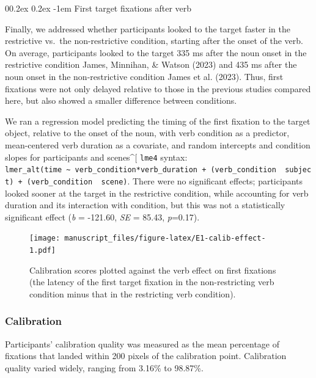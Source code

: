 \documentclass[
  man,floatsintext]{apa6}
\makeatletter
\let\oldparagraph\paragraph
\renewcommand{\paragraph}[1]{\oldparagraph{#1}\mbox{}}
\renewcommand{\paragraph}{\@startsection{paragraph}{4}{\parindent}%
  {0\baselineskip \@plus 0.2ex \@minus 0.2ex}%
  {-1em}%
  {\normalfont\normalsize\bfseries\itshape\typesectitle}}
\makeatother
\begin{document}
\paragraph{First target fixations after verb}\label{first-target-fixations-after-verb}

Finally, we addressed whether participants looked to the target faster in the restrictive vs.~the non-restrictive condition, starting after the onset of the verb. On average, participants looked to the target 335 ms after the noun onset in the restrictive condition James, Minnihan, \& Watson (2023) and 435 ms after the noun onset in the non-restrictive condition James et al. (2023). Thus, first fixations were not only delayed relative to those in the previous studies compared here, but also showed a smaller difference between conditions.

We ran a regression model predicting the timing of the first fixation to the target object, relative to the onset of the noun, with verb condition as a predictor, mean-centered verb duration as a covariate, and random intercepts and condition slopes for participants and scenes\^{}{[} \texttt{lme4} syntax: \texttt{lmer\_alt(time\ \textasciitilde{}\ verb\_condition*verb\_duration\ +\ (verb\_condition\ \textbar{}\textbar{}\ subject)\ +\ (verb\_condition\ \textbar{}\textbar{}\ scene)}. There were no significant effects; participants looked sooner at the target in the restrictive condition, while accounting for verb duration and its interaction with condition, but this was not a statistically significant effect (\emph{b} = -121.60, \emph{SE} = 85.43, \emph{p}=0.17).

\begin{figure}
\centering
\texttt{[image: manuscript\_files/figure-latex/E1-calib-effect-1.pdf]}
\caption{\label{fig:E1-calib-effect}Calibration scores plotted against the verb effect on first fixations (the latency of the first target fixation in the non-restricting verb condition minus that in the restricting verb condition).}
\end{figure}

\subsubsection{Calibration}\label{calibration}

Participants' calibration quality was measured as the mean percentage of fixations that landed within 200 pixels of the calibration point. Calibration quality varied widely, ranging from 3.16\% to 98.87\%.
\end{document}
